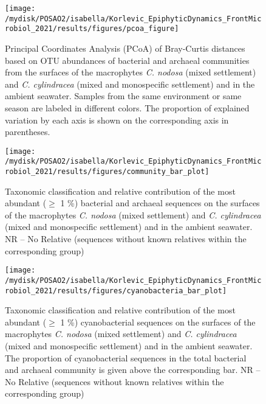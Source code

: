 \documentclass[
  12pt,
]{article}
\begin{document}
\begin{figure}[H]

{\centering \texttt{[image: /mydisk/POSAO2/isabella/Korlevic\_EpiphyticDynamics\_FrontMicrobiol\_2021/results/figures/pcoa\_figure]} 

}

\caption{Principal Coordinates Analysis (PCoA) of Bray-Curtis distances based on OTU abundances of bacterial and archaeal communities from the surfaces of the macrophytes \textit{C. nodosa} (mixed settlement) and \textit{C. cylindracea} (mixed and monospecific settlement) and in the ambient seawater. Samples from the same environment or same season are labeled in different colors. The proportion of explained variation by each axis is shown on the corresponding axis in parentheses.\label{pcoa}}\label{fig:unnamed-chunk-3}
\end{figure}

\begin{figure}[H]

{\centering \texttt{[image: /mydisk/POSAO2/isabella/Korlevic\_EpiphyticDynamics\_FrontMicrobiol\_2021/results/figures/community\_bar\_plot]} 

}

\caption{Taxonomic classification and relative contribution of the most abundant ($\geq$ 1 \si{\percent}) bacterial and archaeal sequences on the surfaces of the macrophytes \textit{C. nodosa} (mixed settlement) and \textit{C. cylindracea} (mixed and monospecific settlement) and in the ambient seawater. NR -- No Relative (sequences without known relatives within the corresponding group)\label{community}}\label{fig:unnamed-chunk-4}
\end{figure}

\begin{figure}[H]

{\centering \texttt{[image: /mydisk/POSAO2/isabella/Korlevic\_EpiphyticDynamics\_FrontMicrobiol\_2021/results/figures/cyanobacteria\_bar\_plot]} 

}

\caption{Taxonomic classification and relative contribution of the most abundant ($\geq$ 1 \si{\percent}) cyanobacterial sequences on the surfaces of the macrophytes \textit{C. nodosa} (mixed settlement) and \textit{C. cylindracea} (mixed and monospecific settlement) and in the ambient seawater. The proportion of cyanobacterial sequences in the total bacterial and archaeal community is given above the corresponding bar. NR -- No Relative (sequences without known relatives within the corresponding group)\label{cyano}}\label{fig:unnamed-chunk-5}
\end{figure}
\end{document}
